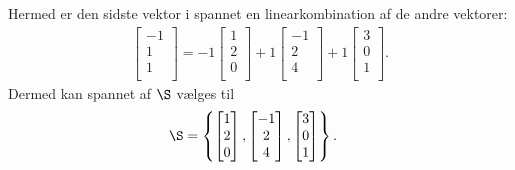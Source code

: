 \begin{eks}
%
Hermed er den sidste vektor i spannet en linearkombination af de andre vektorer:
%
  \begin{align*}
    \begin{bmatrix}
           -1 \\
           1 \\
           1 \\
         \end{bmatrix}
         = 
         -1 \begin{bmatrix}
           1 \\
           2 \\
           0 \\
         \end{bmatrix}
         +1
         \begin{bmatrix}
           -1 \\
           2 \\
           4 \\
         \end{bmatrix}
          +1
         \begin{bmatrix}
           3 \\
           0 \\
           1 \\
         \end{bmatrix}.
  \end{align*} 
%
Dermed kan spannet af $\S$ vælges til
%
\begin{align*}
\S &= \left\{
\begin{bmatrix}
           1 \\
           2 \\
           0 \\
\end{bmatrix}
,
\begin{bmatrix}
           -1 \\
           2 \\
           4 \\
\end{bmatrix}
,
\begin{bmatrix}
           3 \\
           0 \\
           1 \\
\end{bmatrix}
\right\}.
\end{align*}
\end{eks}
%
%
